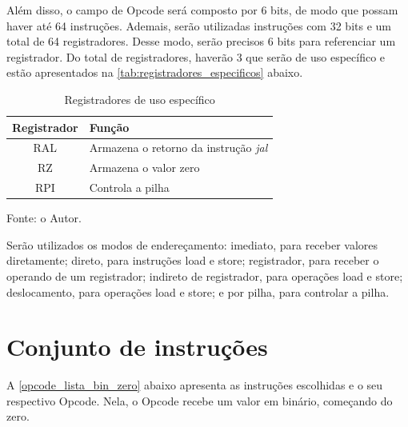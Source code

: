 \documentclass[
	12pt,				%
	oneside,
	a4paper,			%
	english,			%
	french,				%
	spanish,			%
	brazil,				%
	]{abntex2}
\begin{document}
Além disso, o campo de Opcode será composto por 6 bits, de modo que possam haver até 64 instruções. Ademais, serão utilizadas instruções com 32 bits e um total de 64 registradores. Desse modo, serão precisos 6 bits para referenciar um registrador. Do total de registradores, haverão 3 que serão de uso específico e estão apresentados na \autoref{tab:registradores_especificos} abaixo.

\setlength{\tabcolsep}{10pt} %
\begin{table}[H]
\centering
\caption{Registradores de uso específico}
\label{tab:registradores_especificos}
\begin{tabular}{|c|l|}
\hline
\textbf{Registrador} & \textbf{Função} \\
\hline
RAL & Armazena o retorno da instrução \textit{jal} \\
\hline
RZ & Armazena o valor zero \\
\hline
RPI & Controla a pilha \\
\hline
\end{tabular}
\vspace{-0.5em}
\begin{center}
Fonte: o Autor.
\end{center}
\end{table}



Serão utilizados os modos de endereçamento: imediato, para receber valores diretamente; direto, para instruções load e store; registrador, para receber o operando de um registrador; indireto de registrador, para operações load e store; deslocamento, para operações load e store; e por pilha, para controlar a pilha.

\section{Conjunto de instruções}
A \autoref{opcode_lista_bin_zero} abaixo apresenta as instruções escolhidas e o seu respectivo Opcode. Nela, o Opcode recebe um valor em binário, começando do zero.
\end{document}

